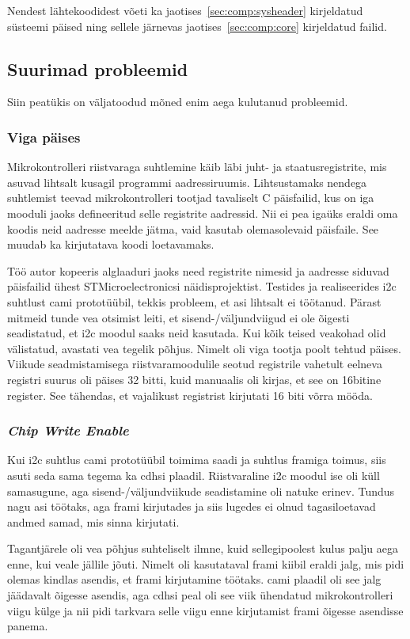 \documentclass[12pt,a4paper]{article}
\begin{document}
Nendest lähtekoodidest võeti ka jaotises~\ref{sec:comp:sysheader} kirjeldatud
süsteemi päised ning sellele järnevas jaotises~\ref{sec:comp:core}
kirjeldatud failid.

\subsection{Suurimad probleemid}
Siin peatükis on väljatoodud mõned enim aega kulutanud probleemid.
\subsubsection{Viga päises}
Mikrokontrolleri riistvaraga suhtlemine käib läbi juht- ja staatusregistrite,
mis asuvad lihtsalt kusagil programmi aadressiruumis. Lihtsustamaks nendega
suhtlemist teevad mikrokontrolleri tootjad tavaliselt C päisfailid, kus on iga
mooduli jaoks defineeritud selle registrite aadressid. Nii ei pea igaüks eraldi
oma koodis neid aadresse meelde jätma, vaid kasutab olemasolevaid päisfaile. See
muudab ka kirjutatava koodi loetavamaks.

Töö autor kopeeris alglaaduri jaoks need registrite nimesid ja aadresse siduvad
päisfailid ühest STMicroelectronicsi näidisprojektist. Testides ja
realiseerides \gls{i2c} suhtlust \gls{cam}i prototüübil, tekkis probleem, et
asi lihtsalt ei töötanud. Pärast mitmeid tunde vea otsimist leiti, et
sisend-/väljundviigud ei ole õigesti seadistatud, et \gls{i2c} moodul saaks neid
kasutada. Kui kõik teised veakohad olid välistatud, avastati vea tegelik põhjus.
Nimelt oli viga tootja poolt tehtud päises. Viikude seadmistamisega
riistvaramoodulile seotud registrile vahetult eelneva registri suurus oli päises
32 bitti, kuid manuaalis oli kirjas, et see on 16bitine register. See tähendas,
et vajalikust registrist kirjutati 16 biti võrra mööda.
\subsubsection{\textit{Chip Write Enable}}
Kui \gls{i2c} suhtlus \gls{cam}i prototüübil toimima saadi ja suhtlus
\gls{fram}iga toimus, siis asuti seda sama tegema ka \gls{cdhs}i plaadil.
Riistvaraline \gls{i2c} moodul ise oli küll samasugune, aga
sisend-/väljundviikude seadistamine oli natuke erinev. Tundus nagu asi töötaks,
aga \gls{fram}i kirjutades ja siis lugedes ei olnud tagasiloetavad andmed samad,
mis sinna kirjutati.

Tagantjärele oli vea põhjus suhteliselt ilmne, kuid sellegipoolest kulus palju
aega enne, kui veale jällile jõuti. Nimelt oli kasutataval \gls{fram}i kiibil
eraldi jalg, mis pidi olemas kindlas asendis, et \gls{fram}i kirjutamine
töötaks. \gls{cam}i plaadil oli see jalg jäädavalt õigesse asendis, aga
\gls{cdhs}i peal oli see viik ühendatud mikrokontrolleri viigu külge ja nii pidi
tarkvara selle viigu enne kirjutamist \gls{fram}i õigesse asendisse panema.
\end{document}
